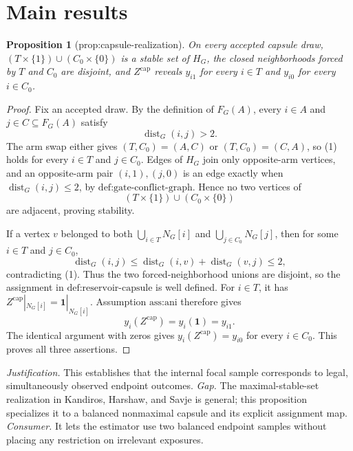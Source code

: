 \documentclass{article}
\newtheorem{proposition}{Proposition}
\begin{document}
\section{Main results}

\begin{proposition}[prop:capsule-realization]\label{prop:capsule-realization}
On every accepted capsule draw, \((T\times\{1\})\cup(C_0\times\{0\})\) is a stable set of \(H_G\), the closed neighborhoods forced by \(T\) and \(C_0\) are disjoint, and \(Z^{\mathrm{cap}}\) reveals \(y_{i1}\) for every \(i\in T\) and \(y_{i0}\) for every \(i\in C_0\).
\end{proposition}
\begin{proof}
Fix an accepted draw.  By the definition of \(F_G(A)\), every \(i\in A\) and \(j\in C\subseteq F_G(A)\) satisfy
\[
\operatorname{dist}_G(i,j)>2. \tag{1}
\]
The arm swap either gives \((T,C_0)=(A,C)\) or \((T,C_0)=(C,A)\), so (1) holds for every \(i\in T\) and \(j\in C_0\).  Edges of \(H_G\) join only opposite-arm vertices, and an opposite-arm pair \((i,1),(j,0)\) is an edge exactly when \(\operatorname{dist}_G(i,j)\le2\), by \(\text{def:gate-conflict-graph}\).  Hence no two vertices of
\[
(T\times\{1\})\cup(C_0\times\{0\})
\]
are adjacent, proving stability.

If a vertex \(v\) belonged to both \(\bigcup_{i\in T}N_G[i]\) and \(\bigcup_{j\in C_0}N_G[j]\), then for some \(i\in T\) and \(j\in C_0\),
\[
\operatorname{dist}_G(i,j)
\le \operatorname{dist}_G(i,v)+\operatorname{dist}_G(v,j)
\le2,
\]
contradicting (1).  Thus the two forced-neighborhood unions are disjoint, so the assignment in \(\text{def:reservoir-capsule}\) is well defined.  For \(i\in T\), it has \(Z^{\mathrm{cap}}|_{N_G[i]}=\boldsymbol 1|_{N_G[i]}\).  Assumption \(\text{ass:ani}\) therefore gives
\[
y_i(Z^{\mathrm{cap}})=y_i(\boldsymbol 1)=y_{i1}.
\]
The identical argument with zeros gives \(y_i(Z^{\mathrm{cap}})=y_{i0}\) for every \(i\in C_0\).  This proves all three assertions.
\end{proof}
\par\smallskip\noindent \textit{Justification.} This establishes that the internal focal sample corresponds to legal, simultaneously observed endpoint outcomes. \textit{Gap.} The maximal-stable-set realization in Kandiros, Harshaw, and Savje is general; this proposition specializes it to a balanced nonmaximal capsule and its explicit assignment map. \textit{Consumer.} It lets the estimator use two balanced endpoint samples without placing any restriction on irrelevant exposures.
\end{document}
